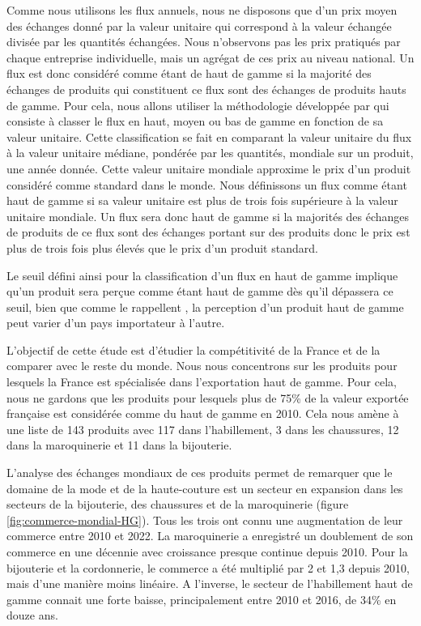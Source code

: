 \documentclass[french,10pt,a4paper]{article}
\begin{document}
Comme nous utilisons les flux annuels, nous ne disposons que d'un prix moyen des échanges donné par la valeur unitaire qui correspond à la valeur échangée divisée par les quantités échangées. Nous n'observons pas les prix pratiqués par chaque entreprise individuelle, mais un agrégat de ces prix au niveau national. Un flux est donc considéré comme étant de haut de gamme si la majorité des échanges de produits qui constituent ce flux sont des échanges de produits hauts de gamme. Pour cela, nous allons utiliser la méthodologie développée par \cite{Fontagne1997} qui consiste à classer le flux en haut, moyen ou bas de gamme en fonction de sa valeur unitaire. Cette classification se fait en comparant la valeur unitaire du flux à la valeur unitaire médiane, pondérée par les quantités, mondiale sur un produit, une année donnée. Cette valeur unitaire mondiale approxime le prix d'un produit considéré comme standard dans le monde. Nous définissons un flux comme étant haut de gamme si sa valeur unitaire est plus de trois fois supérieure à la valeur unitaire mondiale. Un flux sera donc haut de gamme si la majorités des échanges de produits de ce flux sont des échanges portant sur des produits donc le prix est plus de trois fois plus élevés que le prix d'un produit standard.

Le seuil défini ainsi pour la classification d'un flux en haut de gamme implique qu'un produit sera perçue comme étant haut de gamme dès qu'il dépassera ce seuil, bien que comme le rappellent \cite{Martin2015}, la perception d'un produit haut de gamme peut varier d'un pays importateur à l'autre. 

\medskip

L'objectif de cette étude est d'étudier la compétitivité de la France et de la comparer avec le reste du monde. Nous nous concentrons sur les produits pour lesquels la France est spécialisée dans l'exportation haut de gamme. Pour cela, nous ne gardons que les produits pour lesquels plus de 75\% de la valeur exportée française est considérée comme du haut de gamme en 2010. Cela nous amène à une liste de 143 produits avec 117 dans l'habillement, 3 dans les chaussures, 12 dans la maroquinerie et 11 dans la bijouterie.

L'analyse des échanges mondiaux de ces produits permet de remarquer que le domaine de la mode et de la haute-couture est un secteur en expansion dans les secteurs de la bijouterie, des chaussures et de la maroquinerie (figure \ref{fig:commerce-mondial-HG}). Tous les trois ont connu une augmentation de leur commerce entre 2010 et 2022. La maroquinerie a enregistré un doublement de son commerce en une décennie avec croissance presque continue depuis 2010. Pour la bijouterie et la cordonnerie, le commerce a été multiplié par 2 et 1,3 depuis 2010, mais d'une manière moins linéaire. A l'inverse, le secteur de l'habillement haut de gamme connait une forte baisse, principalement entre 2010 et 2016, de 34\% en douze ans. 
\end{document}
